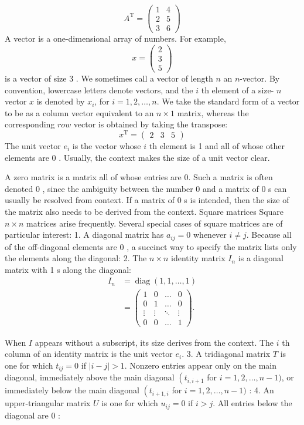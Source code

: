 \documentclass[lang=cn,newtx,10pt,scheme=chinese]{elegantbook}
\begin{document}
$$
A^{\mathrm{T}}=\left(\begin{array}{ll}
1 & 4 \\
2 & 5 \\
3 & 6
\end{array}\right)
$$
A vector is a one-dimensional array of numbers. For example,
$$
x=\left(\begin{array}{l}
2 \\
3 \\
5
\end{array}\right)
$$
is a vector of size 3 . We sometimes call a vector of length $n$ an $n$-vector. By convention, lowercase letters denote vectors, and the $i$ th element of a size- $n$ vector $x$ is denoted by $x_i$, for $i=1,2, \ldots, n$. We take the standard form of a vector to be as a column vector equivalent to an $n \times 1$ matrix, whereas the corresponding $r o w$ vector is obtained by taking the transpose:
$$
x^{\mathrm{T}}=\left(\begin{array}{lll}
2 & 3 & 5
\end{array}\right)
$$
The unit vector $e_i$ is the vector whose $i$ th element is 1 and all of whose other elements are 0 . Usually, the context makes the size of a unit vector clear.

A zero matrix is a matrix all of whose entries are 0. Such a matrix is often denoted 0 , since the ambiguity between the number 0 and a matrix of 0 s can usually be resolved from context. If a matrix of 0 s is intended, then the size of the matrix also needs to be derived from the context.
Square matrices
Square $n \times n$ matrices arise frequently. Several special cases of square matrices are of particular interest:
1. A diagonal matrix has $a_{i j}=0$ whenever $i \neq j$. Because all of the off-diagonal elements are 0 , a succinct way to specify the matrix lists only the elements along the diagonal:
2. The $n \times n$ identity matrix $I_n$ is a diagonal matrix with 1 s along the diagonal:
$$
\begin{aligned}
I_n & =\operatorname{diag}(1,1, \ldots, 1) \\
& =\left(\begin{array}{cccc}
1 & 0 & \ldots & 0 \\
0 & 1 & \ldots & 0 \\
\vdots & \vdots & \ddots & \vdots \\
0 & 0 & \ldots & 1
\end{array}\right) .
\end{aligned}
$$

When $I$ appears without a subscript, its size derives from the context. The $i$ th column of an identity matrix is the unit vector $e_i$.
3. A tridiagonal matrix $T$ is one for which $t_{i j}=0$ if $|i-j|>1$. Nonzero entries appear only on the main diagonal, immediately above the main diagonal $\left(t_{i, i+1}\right.$ for $i=1,2, \ldots, n-1)$, or immediately below the main diagonal $\left(t_{i+1, i}\right.$ for $i=1,2, \ldots, n-1)$ :
4. An upper-triangular matrix $U$ is one for which $u_{i j}=0$ if $i>j$. All entries below the diagonal are 0 :
\end{document}
